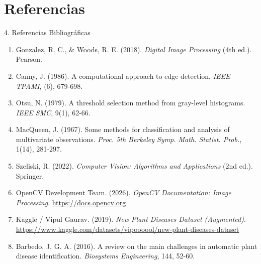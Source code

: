 \documentclass[aspectratio=169,10pt]{beamer}
\begin{document}
\section{Referencias}
\begin{frame}{4. Referencias Bibliográficas}
    \footnotesize
    \begin{enumerate}
        \item Gonzalez, R. C., \& Woods, R. E. (2018). \textit{Digital Image Processing} (4th ed.). Pearson.
        \item Canny, J. (1986). A computational approach to edge detection. \textit{IEEE TPAMI}, (6), 679-698.
        \item Otsu, N. (1979). A threshold selection method from gray-level histograms. \textit{IEEE SMC}, 9(1), 62-66.
        \item MacQueen, J. (1967). Some methods for classification and analysis of multivariate observations. \textit{Proc. 5th Berkeley Symp. Math. Statist. Prob.}, 1(14), 281-297.
        \item Szeliski, R. (2022). \textit{Computer Vision: Algorithms and Applications} (2nd ed.). Springer.
        \item OpenCV Development Team. (2026). \textit{OpenCV Documentation: Image Processing}. \url{https://docs.opencv.org}
        \item Kaggle / Vipul Gaurav. (2019). \textit{New Plant Diseases Dataset (Augmented)}. \url{https://www.kaggle.com/datasets/vipoooool/new-plant-diseases-dataset}
        \item Barbedo, J. G. A. (2016). A review on the main challenges in automatic plant disease identification. \textit{Biosystems Engineering}, 144, 52-60.
    \end{enumerate}
\end{frame}
\end{document}
